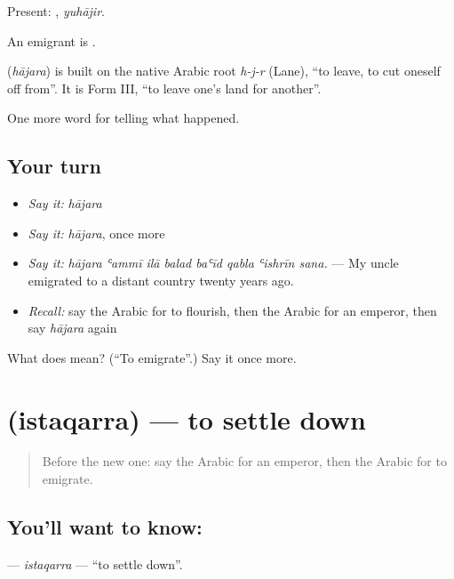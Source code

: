 Present: , \emph{yuhājir}.

An emigrant is .

\begin{cousinweb}
\textbf{} (\emph{hājara}) is built on the native Arabic root \emph{h-j-r} (Lane), \textquotedblleft{}to leave, to cut oneself off from\textquotedblright{}. It is Form III, \textquotedblleft{}to leave one's land for another\textquotedblright{}.
\end{cousinweb}

\begin{grammarlens}[title={What you've built}]
One more word for telling what happened.
\end{grammarlens}

\subsection*{Your turn}
\begin{itemize}
\raggedright
  \item \emph{Say it:} \emph{hājara}
  \item \emph{Say it:} \emph{hājara}, once more
  \item \emph{Say it:} \emph{hājara ʿammī ilā balad baʿīd qabla ʿishrīn sana.} — My uncle emigrated to a distant country twenty years ago.
  \item \emph{Recall:} say the Arabic for to flourish, then the Arabic for an emperor, then say \emph{hājara} again
\end{itemize}

\begin{tcolorbox}[breakable,colback=teal!4,colframe=teal!35!black,title={Before you move on}]
What does  mean? (\textquotedblleft{}To emigrate\textquotedblright{}.) Say it once more.
\end{tcolorbox}
\section[\texorpdfstring{\ar{استقر} (istaqarra)}{استقر (istaqarra)}]{ (istaqarra) — to settle down}

\label{lesson:AR-C332-istaqarra}



\begin{quote}
Before the new one: say the Arabic for an emperor, then the Arabic for to emigrate.
\end{quote}

\subsection*{You'll want to know: }
\textbf{} — \emph{istaqarra} — \textquotedblleft{}to settle down\textquotedblright{}.

